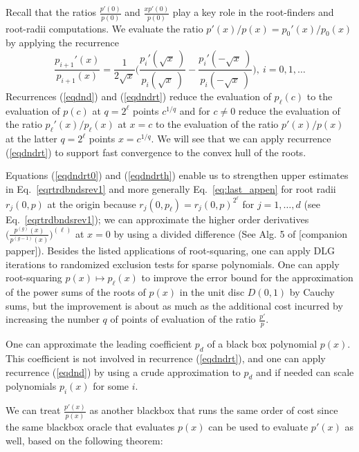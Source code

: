 \documentclass[runningheads]{llncs}
\begin{document}
Recall that the ratios $\frac{p'(0)}{p(0)}$ and $\frac{xp'(0)}{p(0)}$ play a key role in the root-finders and root-radii computations.
We evaluate the ratio
$p'(x)/p(x)=p_0'(x)/p_0(x)$
 by applying
the recurrence
 \begin{equation}\label{eqdndrt} \frac{p_{i+1}'(x)}{p_{i+1}(x)}=\frac{1}{2\sqrt x}\Bigg(\frac{p_{i}'(\sqrt x~)}{p_{i}(\sqrt x~)}-\frac{p_{i}'(-\sqrt x~)}{p_{i}(-\sqrt x~)}\Bigg),~i=0,1,\dots
\end{equation}
Recurrences (\ref{eqdnd}) and (\ref{eqdndrt}) reduce the evaluation  of  $p_{\ell}(c)$ to the evaluation of $p(c)$ at  $q=2^{\ell}$  points
$c^{1/q}$ and  for $c\neq 0$ reduce the evaluation of the ratio
$p_{\ell}'(x)/p_{\ell}(x)$ at $x=c$ to the evaluation
of the ratio
$p'(x)/p(x)$ at the latter $q=2^{\ell}$ points $x=c^{1/q}$.
We will see that we can apply  recurrence (\ref{eqdndrt})
to support fast convergence to the convex hull of the roots.

Equations (\ref{eqdndrt0}) and (\ref{eqdndrth})
enable us to  strengthen
upper estimates in Eq.~\ref{eqrtrdbndsrev1}
and more generally Eq.~\ref{eq:last_appen} for root radii $r_j(0,p)$   at the origin  because $r_j(0,p_{\ell})=r_j(0,p)^{2^{\ell}}$ for $j=1,\dots,d$ (see  Eq.~\ref{eqrtrdbndsrev1}); we can  approximate the higher order derivatives
$\Big(\frac{p^{(g)}(x)}{p^{(g-1)}(x)}\Big)^{(\ell)}$
 at $x=0$ by using a divided difference (See Alg. 5 of [companion papper]). %
Besides the listed applications of
root-squaring, one can apply DLG iterations to randomized exclusion tests for sparse polynomials.
One can apply root-squaring $p(x)\mapsto p_{\ell}(x)$ to improve  the error bound for the approximation of the power sums of the roots of  $p(x)$ in the unit disc $D(0,1)$ by Cauchy sums, but the improvement is about as much as the additional cost incurred by increasing the number $q$ of points of evaluation of the ratio $\frac{p'}{p}$.
\begin{remark}\label{rescdnd}
 One can approximate the leading coefficient $p_d$ of a black box polynomial $p(x)$. This coefficient is not involved in recurrence (\ref{eqdndrt}),
 and one can apply  recurrence (\ref{eqdnd}) by using a crude
 approximation to  $p_d$
 and if needed can scale polynomials
 $p_i(x)$ for some $i$.
\end{remark}



We can treat $\frac{p'(x)}{p(x)}$ as another blackbox that runs the same order of cost since the same blackbox oracle that evaluates $p(x)$ can be used to evaluate $p'(x)$ as well, based on the following theorem:
\end{document}
